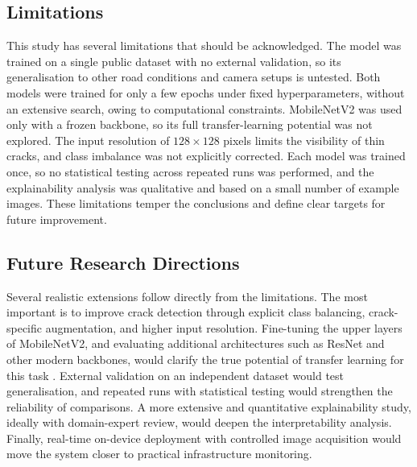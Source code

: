 \documentclass[preprint,12pt]{elsarticle}
\begin{document}
\subsection{Limitations}

This study has several limitations that should be acknowledged.
The model was trained on a single public dataset with no external validation, so its generalisation to other road conditions and camera setups is untested.
Both models were trained for only a few epochs under fixed hyperparameters, without an extensive search, owing to computational constraints.
MobileNetV2 was used only with a frozen backbone, so its full transfer-learning potential was not explored.
The input resolution of $128 \times 128$ pixels limits the visibility of thin cracks, and class imbalance was not explicitly corrected.
Each model was trained once, so no statistical testing across repeated runs was performed, and the explainability analysis was qualitative and based on a small number of example images.
These limitations temper the conclusions and define clear targets for future improvement.

\subsection{Future Research Directions}

Several realistic extensions follow directly from the limitations.
The most important is to improve crack detection through explicit class balancing, crack-specific augmentation, and higher input resolution.
Fine-tuning the upper layers of MobileNetV2, and evaluating additional architectures such as ResNet and other modern backbones, would clarify the true potential of transfer learning for this task \cite{he2016deep}.
External validation on an independent dataset would test generalisation, and repeated runs with statistical testing would strengthen the reliability of comparisons.
A more extensive and quantitative explainability study, ideally with domain-expert review, would deepen the interpretability analysis.
Finally, real-time on-device deployment with controlled image acquisition would move the system closer to practical infrastructure monitoring.
\end{document}
